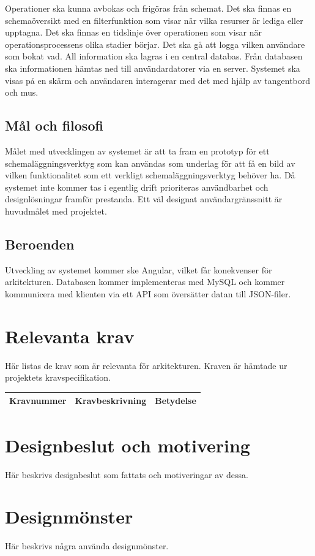 \documentclass[a4paper,10pt]{article}
\begin{document}
Operationer ska kunna avbokas och frigöras från schemat. Det ska finnas en schemaöversikt med en filterfunktion som visar när vilka resurser är lediga eller upptagna. Det ska finnas en tidslinje över operationen som visar när operationsprocessens olika stadier börjar. Det ska gå att logga vilken användare som bokat vad. All information ska lagras i en central databas. Från databasen ska informationen hämtas ned till användardatorer via en server. Systemet ska visas på en skärm och användaren interagerar med det med hjälp av tangentbord och mus.


\subsection{Mål och filosofi}
Målet med utvecklingen av systemet är att ta fram en prototyp för ett schemaläggningsverktyg som kan användas som underlag för att få en bild av vilken funktionalitet som ett verkligt schemaläggningsverktyg behöver ha. Då systemet inte kommer tas i egentlig drift prioriteras användbarhet och designlösningar framför prestanda. Ett väl designat användargränssnitt är huvudmålet med projektet.

\subsection{Beroenden}
Utveckling av systemet kommer ske Angular, vilket får konekvenser för arkitekturen. Databasen kommer implementeras med MySQL och kommer kommunicera med klienten via ett API som översätter datan till JSON-filer.

\section{Relevanta krav}
Här listas de krav som är relevanta för arkitekturen. Kraven är hämtade ur projektets kravspecifikation.

\begin{tabular}{|c|c|c|}
  \hline
  Kravnummer & Kravbeskrivning & Betydelse \\
  \hline
\end{tabular}


\section{Designbeslut och motivering}
Här beskrivs designbeslut som fattats och motiveringar av dessa.

\section{Designmönster}
Här beskrivs några använda designmönster.
\end{document}
